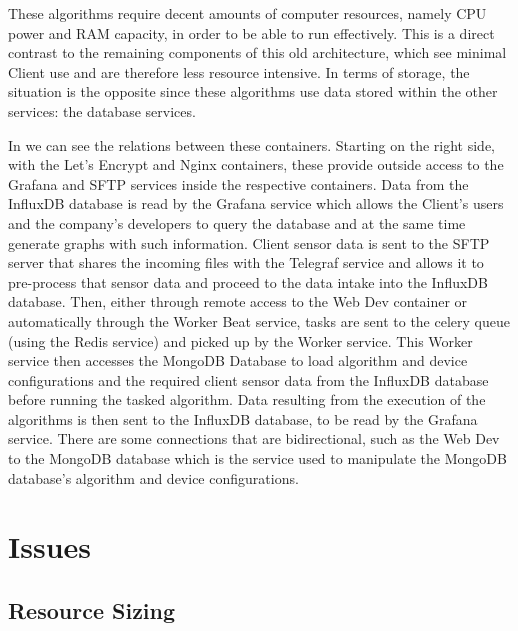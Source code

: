 These algorithms require decent amounts of computer resources, namely CPU power and RAM capacity, in order to be able to run effectively. This is a direct contrast to the remaining components of this old architecture, which see minimal Client use and are therefore less resource intensive. In terms of storage, the situation is the opposite since these algorithms use data stored within the other services: the database services.



In  we can see the relations between these containers. Starting on the right side, with the  Let's Encrypt and Nginx containers, these provide outside access to the Grafana and SFTP services inside the respective containers. Data from the InfluxDB database is read by the Grafana service which allows the Client's users and the company's developers to query the database and at the same time generate graphs with such information. Client sensor data is sent to the SFTP server that shares the incoming files with the Telegraf service and allows it to pre-process that sensor data and proceed to the data intake into the InfluxDB database. Then, either through remote access to the Web Dev container or automatically through the Worker Beat service, tasks are sent to the celery queue (using the Redis service) and picked up by the Worker service. This Worker service then accesses the MongoDB Database to load algorithm and device configurations and the required client sensor data from the InfluxDB database before running the tasked algorithm. Data resulting from the execution of the algorithms is then sent to the InfluxDB database, to be read by the Grafana service. There are some connections that are bidirectional, such as the Web Dev to the MongoDB database which is the service used to manipulate the MongoDB database's algorithm and device configurations.

\section{Issues}\label{methodology:s:issues}

\subsection{Resource Sizing}\label{methodology:ss:resource sizing}



